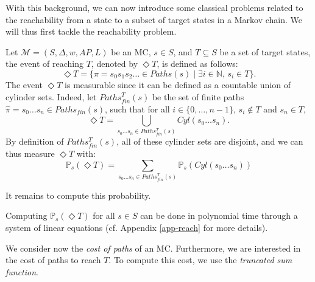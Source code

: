 With this background, we can now introduce some classical problems related to the reachability from a state to a subset of target states in a Markov chain.
We will thus first tackle the reachability problem.
\begin{definition}
  Let $\mathcal{M} = (S, \Delta, w, AP, L)$ be an MC, $s \in S$, and $T \subseteq S$ be a set of target states,
  the event of reaching $T$, denoted by $\Diamond T$,
  is defined as follows:
  \[
    \Diamond T = \{ \pi = s_0 s_1 s_2 \dots \in Paths(s) \; | \; \exists i \in \mathbb{N}, \, s_i \in T\}.
  \]
  The event $\Diamond T$ is measurable since it can be defined as a countable union of cylinder sets. Indeed, let $Paths_{fin}^T(s)$ be the set of finite paths $\hat{\pi} = s_0 \dots s_n \in Paths_{fin}(s)$, such that for all $i \in \{0, \dots, n-1 \}, \, s_i \not \in T$ and $s_n \in T$,
  \[ \Diamond T = \bigcup_{s_0 \dots s_n \in Paths_{fin}^T(s)} Cyl(s_0 \dots s_n). \]
  By definition of $Paths^T_{fin}(s)$, all of these cylinder sets
  are disjoint, and we can thus measure $\Diamond T$ with:
  \[
    \mathbb{P}_s(\Diamond T) = \sum_{s_0 \dots s_n \in Paths_{fin}^T(s)}  \mathbb{P}_s(Cyl(s_0 \dots s_n))
  \]
\end{definition}
It remains to compute this probability.

\begin{theorem}
Computing $\mathbb{P}_s(\Diamond T)$ for all $s \in S$ can be done in polynomial
time through a system of linear equations (cf. Appendix \ref{app-reach} for more details).
\end{theorem}


We consider now the \textit{cost of paths} of an MC. Furthermore, we
are interested in the cost of paths to reach $T$. To compute this cost, we use the \textit{truncated sum function}.


